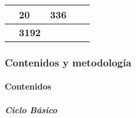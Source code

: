 \documentclass[a4paper, 12pt]{article}
\begin{document}
\begin{center}
\begin{xltabular}{1\textwidth}{|>{\raggedleft\arraybackslash}X |
>{\raggedleft\arraybackslash}X |
>{\raggedright\arraybackslash} p{5cm}|
>{\raggedleft\arraybackslash}X |
>{\raggedleft\arraybackslash}X |}
             & \textbf{20}          &\textbf{336}         \\ \hline
{}                               &\textbf{3192}         \\ \hline
\end{xltabular}
\end{center}
\normalsize


\subsubsection{Contenidos y metodología}
\paragraph{Contenidos}
\subparagraph{Ciclo Básico}
\end{document}
